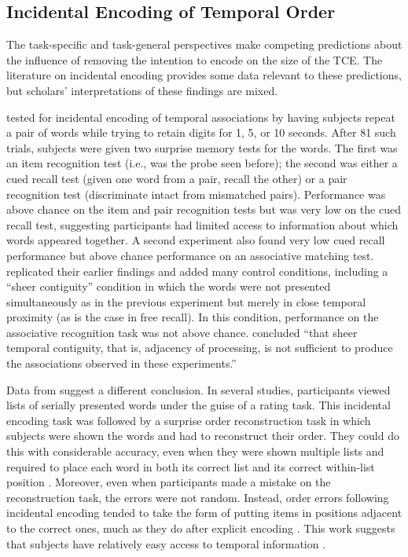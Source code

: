 \documentclass[man,natbib,floatsintext]{apa6} %
\begin{document}
\subsection{Incidental Encoding of Temporal Order}
The task-specific and task-general perspectives make competing predictions about the influence of removing the intention to encode on the size of the TCE. The literature on incidental encoding provides some data relevant to these predictions, but scholars' interpretations of these findings are mixed. 

\citet{GlenBrad79} tested for incidental encoding of temporal associations by having subjects repeat a pair of words while trying to retain digits for 1, 5, or 10 seconds. After 81 such trials, subjects were given two surprise memory tests for the words. The first was an item recognition test (i.e., was the probe seen before); the second was either a cued recall test (given one word from a pair, recall the other) or a pair recognition test (discriminate intact from mismatched pairs). Performance was above chance on the item and pair recognition tests but was very low on the cued recall test, suggesting participants had limited access to information about which words appeared together. A second experiment also found very low cued recall performance but above chance performance on an associative matching test. \citet{BradGlen83} replicated their earlier findings and added many control conditions, including a ``sheer contiguity'' condition in which the words were not presented simultaneously as in the previous experiment but merely in close temporal proximity (as is the case in free recall). In this condition, performance on the associative recognition task was not above chance. \citet[][p. 665]{BradGlen83} concluded ``that sheer temporal contiguity, that is, adjacency of processing, is not sufficient to produce the associations observed in these experiments.''

Data from \citet{Nair91, Nair90b} suggest a different conclusion. In several studies, participants viewed lists of serially presented words under the guise of a rating task. This incidental encoding task was followed by a surprise order reconstruction task in which subjects were shown the words and had to reconstruct their order. They could do this with considerable accuracy, even when they were shown multiple lists and required to place each word in both its correct list and its correct within-list position \citep{Nair91}. Moreover, even when participants made a mistake on the reconstruction task, the errors were not random. Instead, order errors following incidental encoding tended to take the form of putting items in positions adjacent to the correct ones, much as they do after explicit encoding \citep{Heal74}. This work suggests that subjects have relatively easy access to temporal information \citep[for related examples of access to order information after incidental encoding, see][]{Burn96,SerrNair93}. 
\end{document}
